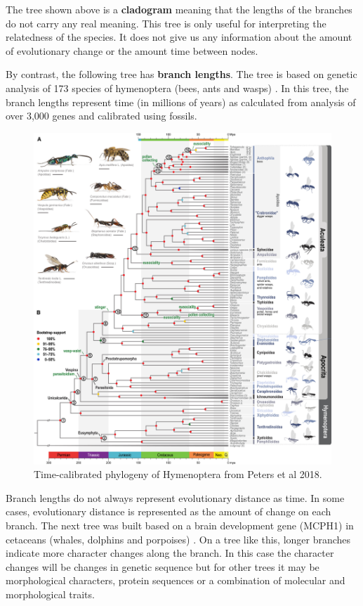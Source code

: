 \documentclass[
]{book}
\begin{document}
The tree shown above is a \textbf{cladogram} meaning that the lengths of the branches do not carry any real meaning. This tree is only useful for interpreting the relatedness of the species. It does not give us any information about the amount of evolutionary change or the amount time between nodes.

By contrast, the following tree has \textbf{branch lengths}. The tree is based on genetic analysis of 173 species of hymenoptera (bees, ants and wasps) \citep{Peters17}. In this tree, the branch lengths represent time (in millions of years) as calculated from analysis of over 3,000 genes and calibrated using fossils.

\begin{figure}[H]

{\centering \includegraphics[width=46.94in]{Images/hymenoptera} 

}

\caption{Time-calibrated phylogeny of Hymenoptera from Peters et al 2018.}\label{fig:unnamed-chunk-19}
\end{figure}

Branch lengths do not always represent evolutionary distance as time. In some cases, evolutionary distance is represented as the amount of change on each branch. The next tree was built based on a brain development gene (MCPH1) in cetaceans (whales, dolphins and porpoises) \citep{McGowen11}. On a tree like this, longer branches indicate more character changes along the branch. In this case the character changes will be changes in genetic sequence but for other trees it may be morphological characters, protein sequences or a combination of molecular and morphological traits.
\end{document}
